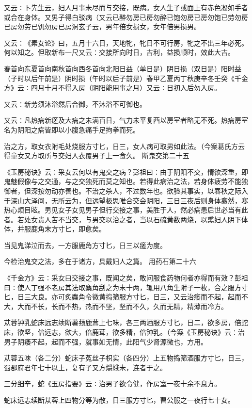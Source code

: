 \documentclass[a4paper,12pt,UTF8,twoside]{ctexbook}
\begin{document}
又云∶卜先生云，妇人月事未尽而与交接，既病。女人生子或面上有赤色凝如手者或合在身体。又男子得白驳病（又云已醉勿房已房勿醉已饱勿房已房勿饱已劳勿房已房勿劳已饥勿房已房洞玄子云，男年倍女损女，女年倍男损男。

又云∶《素女论》曰，五月十六日，天地牝，牝日不可行房，牝之不出三年必死。何以知之。但取新布一尺又云∶交接所向时日，吉利，益损顺时，效此大吉。

春首向东夏首向南秋首向西冬首向北阳日益（单日是）阴日损（双日是）阳时益（子时以后午前是）阴时损（午时以后子前是）春甲乙夏丙丁秋庚辛冬壬癸《千金方》云∶四月十月不得入房（阴阳能用事之月）又云∶日初入后勿入房。

又云∶新劳须沐浴然后合御，不沐浴不可御也。

又云∶凡热病新瘥及大病之未满百日，气力未平复西以房室者略无不死。热病房室名为阴阳之病皆即以小腹急痛手足拘拳而死。

治之方，取女衣附毛处烧服方寸匕，日三，女人病可取男如此法。（今案葛氏方云得童女又方取所与交妇人衣覆男子上一食久。
断鬼交第二十五

《玉房秘诀》云∶采女云何以有鬼交之病？彭祖曰∶由于阴阳不交，情欲深重，即鬼魅假像与之交通，与之交独死而莫之知也。若得此病治之法，若身体疲劳不能独御者，但深按勿动亦善也。不治之杀人，不过数年也。欲验其事实，以春秋之际入于深山大泽间，无所云为，但远望极思唯合交会阴阳，三日三夜后则身体翕然，寒热心烦目眩。男见女子女见男子但行交接之事，美胜于人，然必病患后世必当有此者。若处女贵人苦不当交，与男交以治之者，当以石硫黄数两烧，以熏妇人阴下体体，并服鹿角末方寸匕，即愈矣。

当见鬼涕泣而去，一方服鹿角方寸匕，日三以瘥为度。

今检治鬼交之法，多在于诸方，具戴妇人之篇。
用药石第二十六

《千金方》云∶采女曰交接之事，既闻之矣，敢问服食药物何者亦得而有效？彭祖曰∶使人丁强不老房其法取麋角刮之为末十两，辄用八角生附子一枚，合之服方寸匕，日三大良。亦可炙麋角令微黄捣筛服方寸匕，日三，又云治痿而不起，起而不大，大而不长，长而不热，热而不坚，坚而不久，久而无精，精薄而冷方。

苁蓉钟乳蛇床远志续断薯蓣鹿茸上七味，各三两酒服方寸匕，日二，欲多房，倍蛇床，欲坚，倍远志，欲大，倍鹿茸，欲多精，倍钟乳。（今案《玉房秘诀》云∶治男子阴痿不起，起而不强，就事如无情，此阳气少肾源微也，方用。

苁蓉五味（各二分）蛇床子菟丝子枳实（各四分）上五物捣筛酒服方寸匕，日三，蜀郡府君年七十以上，复有子又方爝蛾未，连者于之。

三分细辛，蛇《玉房指要》云∶治男子欲令健，作房室一夜十余不息方。

蛇床远志续断苁蓉上四物分等为散，日三服方寸匕，曹公服之一夜行七十女。
\end{document}
